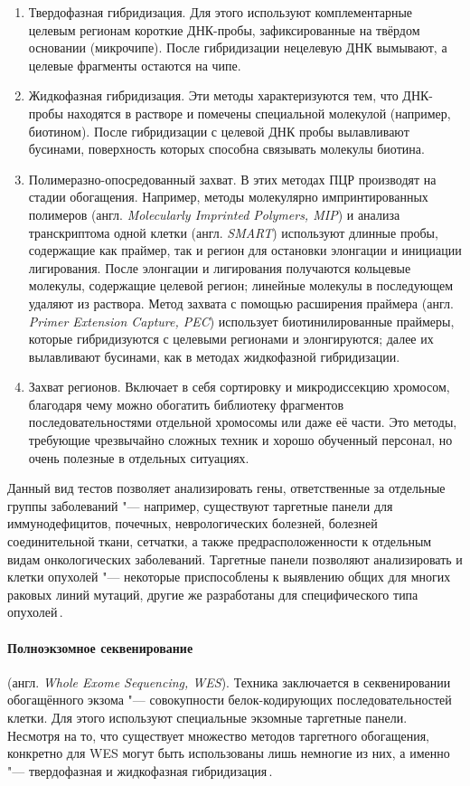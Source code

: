 \documentclass[a4paper,14pt]{extarticle}
\newcommand{\ecitep}[1]{\textenglish{\citep{#1}}}
\newcommand{\engterm}[1]{англ. \textenglish{\textit{#1}}}
\begin{document}
\begin{enumerate}
	\item Твердофазная гибридизация.
	 Для этого используют комплементарные целевым регионам короткие ДНК-пробы, зафиксированные на твёрдом основании (микрочипе).
	 После гибридизации нецелевую ДНК вымывают, а целевые фрагменты остаются на чипе.
	\item Жидкофазная гибридизация.
	 Эти методы характеризуются тем, что ДНК-пробы находятся в растворе и помечены специальной молекулой (например, биотином).
	 После гибридизации с целевой ДНК пробы вылавливают бусинами, поверхность которых способна связывать молекулы биотина.
	\item Полимеразно-опосредованный захват.
	 В этих методах ПЦР производят на стадии обогащения.
	 Например, методы молекулярно импринтированных полимеров (\engterm{Molecularly Imprinted Polymers, MIP}) и анализа транскриптома одной клетки (\engterm{SMART}) используют длинные пробы, содержащие как праймер, так и регион для остановки элонгации и инициации лигирования.
	 После элонгации и лигирования получаются кольцевые молекулы, содержащие целевой регион;
	 линейные молекулы в последующем удаляют из раствора.
	 Метод захвата с помощью расширения праймера (\engterm{Primer Extension Capture, PEC}) использует биотинилированные праймеры, которые гибридизуются с целевыми регионами и элонгируются;
	 далее их вылавливают бусинами, как в методах жидкофазной гибридизации.
	\item Захват регионов.
	 Включает в себя сортировку и микродиссекцию хромосом, благодаря чему можно обогатить библиотеку фрагментов последовательностями отдельной хромосомы или даже её части.
	 Это методы, требующие чрезвычайно сложных техник и хорошо обученный персонал, но очень полезные в отдельных ситуациях.
\end{enumerate}

Данный вид тестов позволяет анализировать гены, ответственные за отдельные группы заболеваний "--- например, существуют таргетные панели для иммунодефицитов, почечных, неврологических болезней, болезней соединительной ткани, сетчатки, а также предрасположенности к отдельным видам онкологических заболеваний.
Таргетные панели позволяют анализировать и клетки опухолей "--- некоторые приспособлены к выявлению общих для многих раковых линий мутаций, другие же разработаны для специфического типа опухолей\,\ecitep{Yohe_2017}.

\paragraph{Полноэкзомное секвенирование} (\engterm{Whole Exome Sequencing, WES}).
Техника заключается в секвенировании обогащённого экзома "--- совокупности белок-кодирующих последовательностей клетки.
Для этого используют специальные экзомные таргетные панели.
Несмотря на то, что существует множество методов таргетного обогащения, конкретно для WES могут быть использованы лишь немногие из них, а именно "--- твердофазная и жидкофазная гибридизация\,\ecitep{Teer_2010}.
\end{document}
